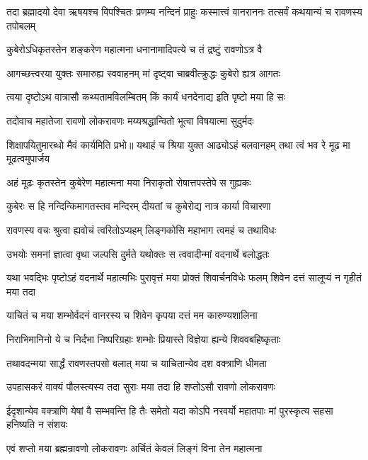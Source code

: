 \threelineshloka
{तदा ब्रह्मादयो देवा ऋषयश्च विपश्चितः}
{प्रणम्य नन्दिनं प्राहुः कस्मात्त्वं वानराननः}
{तत्सर्वं कथयान्यं च रावणस्य तपोबलम्}%


\twolineshloka
{कुबेरोऽधिकृतस्तेन शङ्करेण महात्मना}
{धनानामादिपत्ये च तं द्रष्टुं रावणोऽत्र वै}%

\twolineshloka
{आगच्छत्त्वरया युक्तः समारुह्य स्ववाहनम्}
{मां दृष्ट्वा चाब्रवीत्क्रुद्धः कुबेरो ह्यत्र आगतः}%

\twolineshloka
{त्वया दृष्टोऽथ वात्रासौ कथ्यतामविलम्बितम्}
{किं कार्यं धनदेनाद्य इति पृष्टो मया हि सः}%

\twolineshloka
{तदोवाच महातेजा रावणो लोकरावणः}
{मय्यश्रद्धान्वितो भूत्वा विषयात्मा सुदुर्मदः}%

\threelineshloka
{शिक्षापयितुमारब्धो मैवं कार्यमिति प्रभो॥}
{यथाहं च श्रिया युक्त आढ्योऽहं बलवानहम्}
{तथा त्वं भव रे मूढ मा मूढत्वमुपार्जय}%

\twolineshloka
{अहं मूढः कृतस्तेन कुबेरेण महात्मना}
{मया निराकृतो रोषात्तपस्तेपे स गुह्यकः}%

\twolineshloka
{कुबेरः स हि नन्दिन्किमागतस्तव मन्दिरम्}
{दीयतां च कुबेरोद्य नात्र कार्या विचारणा}%

\twolineshloka
{रावणस्य वचः श्रुत्वा ह्यवोचं त्वरितोऽप्यहम्}
{लिङ्गकोसि महाभाग त्वमहं च तथाविधः}%

\twolineshloka
{उभयोः समनां ज्ञात्वा वृथा जल्पसि दुर्मते}
{यथोक्तः स त्ववादीन्मां वदनार्थे बलोद्धतः}%

\threelineshloka
{यथा भवद्भिः पृष्टोऽहं वदनार्थे महात्मभिः}
{पुरावृत्तं मया प्रोक्तं शिवार्चनविधेः फलम्}
{शिवेन दत्तं सालूप्यं न गृहीतं मया तदा}%

\twolineshloka
{याचितं च मया शम्भोर्वदनं वानरस्य च}
{शिवेन कृपया दत्तं मम कारुण्यशालिना}%

\twolineshloka
{निराभिमानिनो ये च निर्दभा निष्परिग्रहाः}
{शम्भोः प्रियास्ते विज्ञेया ह्यन्ये शिववबहिष्कृताः}%

\twolineshloka
{तथावदन्मया सार्द्धं रावणस्तपसो बलात्}
{मया च याचितान्येव दश वक्त्राणि धीमता}%

\twolineshloka
{उपहासकरं वाक्यं पौलस्त्यस्य तदा सुराः}
{मया तदा हि शप्तोऽसौ रावणो लोकरावणः}%

\threelineshloka
{ईदृशान्येव वक्त्राणि येषां वै सम्भवन्ति हि}
{तैः समेतो यदा कोऽपि नरवर्यो महातपाः}
{मां पुरस्कृत्य सहसा हनिष्यति न संशयः}%

\twolineshloka
{एवं शप्तो मया ब्रह्मन्रावणो लोकरावणः}
{अर्चितं केवलं लिङ्गं विना तेन महात्मना}%

